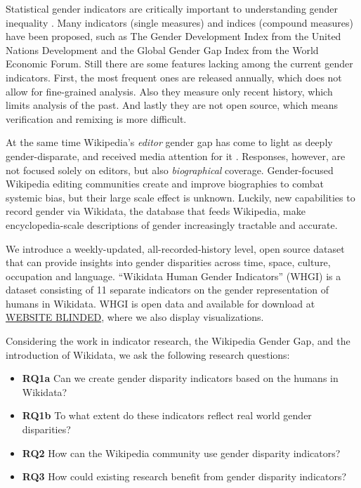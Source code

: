 \documentclass{sig-alternate-05-2015}
\begin{document}
Statistical gender indicators are critically important to understanding gender inequality \cite{klasen_gender-related_2004}. Many indicators (single measures) and indices (compound measures) have been proposed, such as The Gender Development Index from the United Nations Development and the Global Gender Gap Index from the World Economic Forum. Still there are some features lacking among the current gender indicators. First, the most frequent ones are released annually, which does not allow for fine-grained analysis. Also they measure only recent history, which limits analysis of the past. And lastly they are not open source, which means verification and remixing is more difficult.


At the same time Wikipedia's \textit{editor} gender gap has come to light as deeply gender-disparate, and received media attention for it \cite{cohen_wikipedia_2011}. Responses, however, are not focused solely on editors, but also \textit{biographical} coverage. Gender-focused Wikipedia editing communities create and improve biographies to combat systemic bias, but their large scale effect is unknown. Luckily, new capabilities to record gender via Wikidata, the database that feeds Wikipedia, make encyclopedia-scale descriptions of gender increasingly tractable and accurate.

We introduce a weekly-updated, all-recorded-history level, open source dataset that can provide insights into gender disparities across time, space, culture, occupation and language. ``Wikidata Human Gender Indicators'' (WHGI) is a dataset consisting  of 11 separate indicators on the gender representation of humans in Wikidata. WHGI is open data and available for download at \url{WEBSITE BLINDED}, where we also display visualizations. 

Considering the work in indicator research, the Wikipedia Gender Gap, and the introduction of Wikidata, we ask the following research questions:
\begin{itemize}
\item\textbf{RQ1a} Can we create gender disparity indicators based on the humans in Wikidata?
\item\textbf{RQ1b} To what extent do these indicators reflect real world gender disparities?
\item\textbf{RQ2} How can the Wikipedia community use gender disparity indicators?
\item\textbf{RQ3} How could existing research benefit from gender disparity indicators?
\end{itemize}
\end{document}
